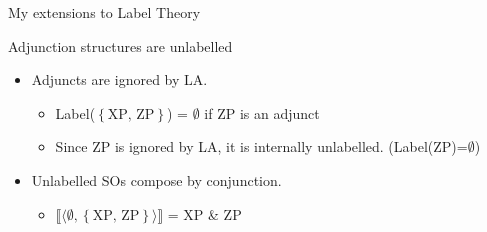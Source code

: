 \documentclass[Proposal]{subfiles}
\begin{document}
\begin{frame}
  {My extensions to Label Theory}
  \begin{block}
    {Adjunction structures are unlabelled}
    \begin{itemize}
      \item Adjuncts are ignored by LA.
	\begin{itemize}
	  \item Label($\left\{ \text{XP, ZP} \right\}$) = $\emptyset$ if ZP is an adjunct
	  \item Since ZP is ignored by LA, it is internally unlabelled. (Label(ZP)=$\emptyset$)
	\end{itemize}
	\pause
      \item Unlabelled SOs compose by conjunction.
	\begin{itemize}
	  \item $\llbracket\langle \emptyset, \left\{ \text{XP, ZP} \right\}\rangle\rrbracket$ = XP \& ZP 
	\end{itemize}
    \end{itemize}
  \end{block}
\end{frame}

\end{document}
